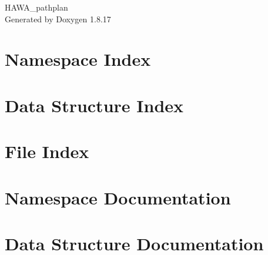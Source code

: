 \let\mypdfximage\pdfximage\def\pdfximage{\immediate\mypdfximage}\documentclass[twoside]{book}
\newcommand{\+}{\discretionary{\mbox{\scriptsize$\hookleftarrow$}}{}{}}
\newcommand{\clearemptydoublepage}{%
  \newpage{\pagestyle{empty}\cleardoublepage}%
}
\begin{document}
\hypersetup{pageanchor=false,
             bookmarksnumbered=true,
             pdfencoding=unicode
            }
\begin{titlepage}
\vspace*{7cm}
\begin{center}%
{\Large H\+A\+W\+A\+\_\+pathplan }\\
\vspace*{1cm}
{\large Generated by Doxygen 1.8.17}\\
\end{center}
\end{titlepage}
\clearemptydoublepage
{}
\tableofcontents
\clearemptydoublepage
{}
\hypersetup{pageanchor=true}

\chapter{Namespace Index}

\chapter{Data Structure Index}

\chapter{File Index}

\chapter{Namespace Documentation}


\chapter{Data Structure Documentation}









































\end{document}
